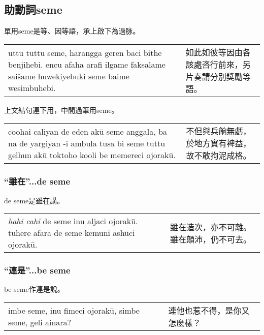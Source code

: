 \documentclass{article}
\begin{document}
\subsection{助動詞seme}
\noindent 單用seme是等、因等語，承上啟下為過脉。
\begin{center}
    \begin{tabularx}{\textwidth}{XX}
     uttu tuttu seme, harangga geren baci bithe benjihebi. encu afaha arafi ilgame faksalame sai\v{s}ame huwekiyebuki seme baime wesimbuhebi.&如此如彼等因由各該處咨行前來，另片奏請分別獎勵等語。
    \end{tabularx}
\end{center}

\noindent 上文結句連下用，中間過筆用seme。
\begin{center}
    \begin{tabularx}{\textwidth}{XX}
     coohai caliyan de eden ak\={u} seme anggala, ba na de yargiyan -i ambula tusa bi seme tuttu gelhun ak\={u} toktoho kooli be memereci ojorak\={u}. &不但與兵餉無虧，於地方實有裨益，故不敢拘泥成格。
    \end{tabularx}
\end{center}

\subsubsection{“雖在”...de seme}
\noindent de seme是雖在講。
\begin{center}
    \begin{tabularx}{\textwidth}{XX}
     \emph{hahi cahi} de seme inu aljaci ojorak\={u}. tuhere afara de seme kemuni ash\={u}ci ojorak\={u}.&雖在造次，亦不可離。雖在顛沛，仍不可去。
    \end{tabularx}
\end{center}

\subsubsection{“連是”...be seme}
\noindent be seme作連是說。
\begin{center}
    \begin{tabularx}{\textwidth}{XX}
     imbe seme, inu fimeci ojorak\={u}, simbe seme, geli ainara?&連他也惹不得，是你又怎麼樣？
    \end{tabularx}
\end{center}
\end{document}
